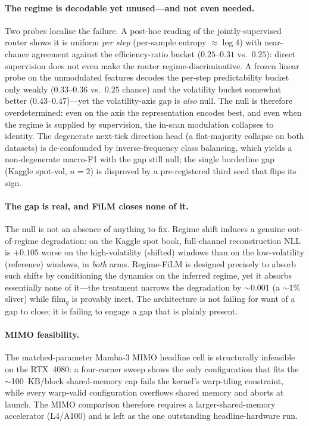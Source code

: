 \paragraph{The regime is decodable yet unused---and not even needed.}
Two probes localise the failure. A post-hoc reading of the jointly-supervised router
shows it is uniform \emph{per step} (per-sample entropy $\approx \log 4$) with near-chance
agreement against the efficiency-ratio bucket ($0.25$--$0.31$ vs.\ $0.25$): direct
supervision does not even make the router regime-discriminative. A frozen linear probe on
the unmodulated features decodes the per-step predictability bucket only weakly
($0.33$--$0.36$ vs.\ $0.25$ chance) and the volatility bucket somewhat better
($0.43$--$0.47$)---yet the volatility-axis gap is \emph{also} null. The null is therefore
overdetermined: even on the axis the representation encodes best, and even when the regime
is supplied by supervision, the in-scan modulation collapses to identity. The degenerate
next-tick direction head (a flat-majority collapse on both datasets) is de-confounded by
inverse-frequency class balancing, which yields a non-degenerate macro-F1 with the gap
still null; the single borderline gap (Kaggle spot-vol, $n{=}2$) is disproved by a
pre-registered third seed that flips its sign.

\paragraph{The gap is real, and FiLM closes none of it.}
The null is not an absence of anything to fix. Regime shift induces a genuine out-of-regime
degradation: on the Kaggle spot book, full-channel reconstruction NLL is $+0.105$ worse on
the high-volatility (shifted) windows than on the low-volatility (reference) windows, in
\emph{both} arms. Regime-FiLM is designed precisely to absorb such shifts by conditioning
the dynamics on the inferred regime, yet it absorbs essentially none of it---the treatment
narrows the degradation by $\sim\!0.001$ (a $\sim\!1\%$ sliver) while $\mathrm{film}_g$ is
provably inert. The architecture is not failing for want of a gap to close; it is failing to
engage a gap that is plainly present.

\paragraph{MIMO feasibility.}
The matched-parameter Mamba-3 MIMO headline cell is structurally infeasible on the
RTX~4080: a four-corner sweep shows the only configuration that fits the
$\sim$100~KB/block shared-memory cap fails the kernel's warp-tiling constraint, while
every warp-valid configuration overflows shared memory and aborts at launch. The MIMO
comparison therefore requires a larger-shared-memory accelerator (L4/A100) and is left as
the one outstanding headline-hardware run.
